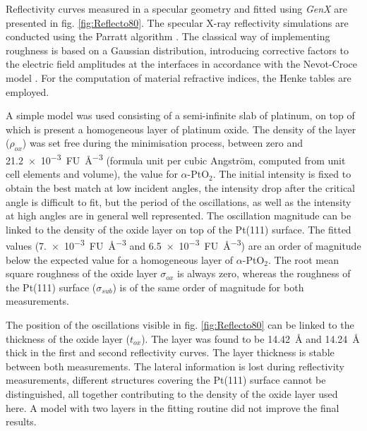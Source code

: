 Reflectivity curves measured in a specular geometry and fitted using \textit{GenX} \parencite{Bjorck2007, Glavic2022} are presented in fig. \ref{fig:Reflecto80}.
The specular X-ray reflectivity simulations are conducted using the Parratt algorithm \parencite{Parratt1954}.
The classical way of implementing roughness is based on a Gaussian distribution, introducing corrective factors to the electric field amplitudes at the interfaces in accordance with the Nevot-Croce model \parencite{Nevot1980}.
For the computation of material refractive indices, the Henke tables \parencite{Henke1993} are employed.

A simple model was used consisting of a semi-infinite slab of platinum, on top of which is present a homogeneous layer of platinum oxide.
The density of the layer ($\rho_{ox}$) was set free during the minimisation process, between zero and \qty{21.2e-3}{FU\per\cubic\angstrom} (formula unit per cubic Angström, computed from unit cell elements and volume), the value for $\alpha$-PtO$_2$.
The initial intensity is fixed to obtain the best match at low incident angles, the intensity drop after the critical angle is difficult to fit, but the period of the oscillations, as well as the intensity at high angles are in general well represented.
The oscillation magnitude can be linked to the density of the oxide layer on top of the Pt(111) surface.
The fitted values (\qty{7.e-3}{FU\per\cubic\angstrom} and \qty{6.5e-3}{FU\per\cubic\angstrom}) are an order of magnitude below the expected value for a homogeneous layer of $\alpha$-PtO$_2$.
The root mean square roughness of the oxide layer $\sigma_{ox}$ is always zero, whereas the roughness of the Pt(111) surface ($\sigma_{sub}$) is of the same order of magnitude for both measurements.

The position of the oscillations visible in fig. \ref{fig:Reflecto80} can be linked to the thickness of the oxide layer ($t_{ox}$).
The layer was found to be \qty{14.42}{\angstrom} and \qty{14.24}{\angstrom} thick in the first and second reflectivity curves.
The layer thickness is stable between both measurements.
The lateral information is lost during reflectivity measurements, different structures covering the Pt(111) surface cannot be distinguished, all together contributing to the density of the oxide layer used here.
A model with two layers in the fitting routine did not improve the final results.


